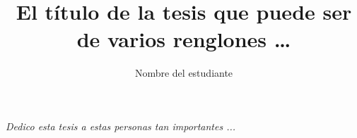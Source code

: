 \documentclass[letterpaper,12pt,twoside]{book}         %
\title{El título de la tesis que puede ser de varios renglones \ldots}
\author{Nombre del estudiante}
\begin{document}
\maketitle %

\begingroup
 \thispagestyle{empty} 

\frontmatter

\vspace*{\fill}
\begin{flushright}%
  \emph{Dedico esta tesis a estas personas tan importantes ...}
  \thispagestyle{empty}
\end{flushright}
\vspace*{\fill}
\cleardoublepage


\cleardoublepage


\cleardoublepage


\renewcommand\contentsname{Índice general}
\tableofcontents
\cleardoublepage

\listoffigures
\cleardoublepage

\listoftables
\cleardoublepage


\mainmatter
{}  %











 
  


\appendix
 
 

\backmatter
\end{document}

